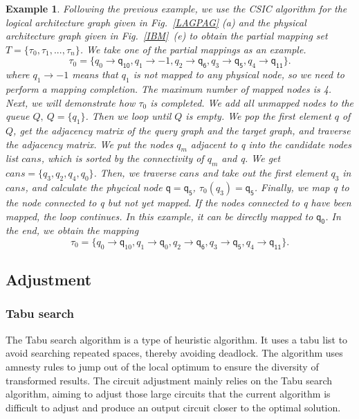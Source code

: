 \documentclass[journal]{IEEEtran}
\newtheorem{example}{Example}
\begin{document}
\begin{example}
	Following the previous example, we use the CSIC algorithm for the logical architecture graph given in Fig.~\ref{LAGPAG} (a) and the physical architecture graph given in Fig.~\ref{IBM}~(e) to obtain the partial mapping set $T=\{\tau_{0},\tau_{1},...,\tau_{n}\}$. We take one of the partial mappings as an example.
	$$\tau_{0}=\{\textit{q}_\textit{0}\rightarrow \textsf{q}_{\textsf{10}},\textit{q}_\textit{1}\rightarrow -1,
	\textit{q}_\textit{2}\rightarrow \textsf{q}_{\textsf{6}},\textit{q}_\textit{3}\rightarrow \textsf{q}_{\textsf{5}},\textit{q}_\textit{4}\rightarrow \textsf{q}_{\textsf{11}}\}. $$ 
where $\textit{q}_\textit{1}\rightarrow -1$ means that $\textit{q}_\textit{1}$ is not mapped to any physical node, so we need to perform a mapping completion. The maximum number of mapped nodes is 4. Next, we will demonstrate how $\tau_{0}$ is completed. We add all unmapped nodes to the queue $Q, \ Q=\{\textit{q}_\textit{1}\}$. Then we loop until $Q$ is empty. We pop the first element $q$ of $Q$, get the adjacency matrix of the query graph and the target graph, and traverse the adjacency matrix. We put the nodes  $\textit{q}_\textit{m}$ adjacent to \textit{q} into the candidate nodes list $cans$, which is sorted by the connectivity of $\textit{q}_\textit{m}$ and \textit{q}. We get $cans=\{\textit{q}_\textit{3},\textit{q}_\textit{2},\textit{q}_\textit{4},\textit{q}_\textit{0}\}$. Then, we traverse $cans$ and take out  the first element $\textit{q}_\textit{3}$ in $cans$, and calculate the phycical node $\textsf{q}=\textsf{q}_{\textsf{5}}$, $\tau_0(\textit{q}_\textit{3})=\textsf{q}_{\textsf{5}}$. Finally, we map \textit{q} to the node connected to \textsf{q} but not yet mapped. If the nodes connected to \textsf{q} have been mapped, the loop continues. In this example, it can be directly mapped to $\textsf{q}_{\textsf{0}}$. In the end, we obtain the mapping $$ \tau_{0}=\{\textit{q}_\textit{0}\rightarrow  \textsf{q}_{10},\textit{q}_\textit{1}\rightarrow \textsf{q}_{0},	\textit{q}_\textit{2}\rightarrow  \textsf{q}_{\textsf{6}},\textit{q}_\textit{3}\rightarrow  \textsf{q}_{\textsf{5}},\textit{q}_\textit{4}\rightarrow  \textsf{q}_{\textsf{11}}\}. $$
	\end{example}
\subsection{Adjustment}
\subsubsection{Tabu search}
The Tabu search algorithm is a type of heuristic algorithm. It uses a tabu list to avoid searching repeated spaces, thereby avoiding deadlock. The algorithm uses amnesty rules to jump out of the local optimum to ensure the diversity of transformed results. The circuit adjustment mainly relies on the Tabu search algorithm, aiming to adjust those large circuits that the current algorithm is difficult to adjust and produce an output circuit closer to the optimal solution.
\end{document}
